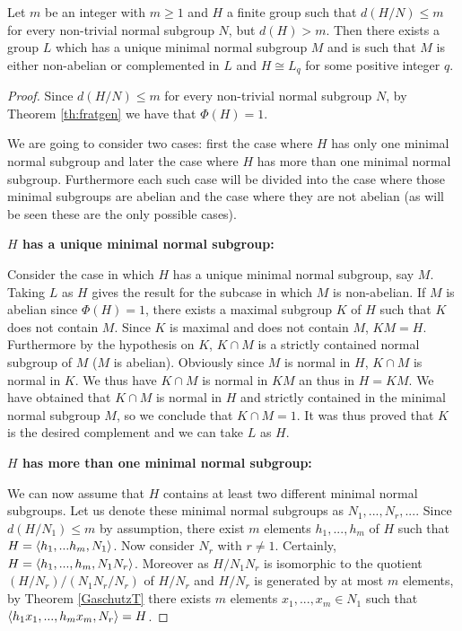 \begin{theorem}
    Let $m$ be an integer with $m \ge 1$ and $H$ a finite group such that $d(H/N) \le m$ for every non-trivial normal subgroup $N$, but $d(H) > m$. Then there exists a group $L$ which has a unique minimal normal subgroup $M$ and is such that $M$ is either non-abelian or complemented in $L$ and $H \cong L_q$ for some positive integer $q$.
\end{theorem}
\begin{proof}
    Since $d(H/N) \le m$ for every non-trivial normal subgroup $N$, by Theorem \ref{th:fratgen} we have that $\Phi(H) = 1$.
    
    We are going to consider two cases: first the case where $H$ has only one minimal normal subgroup and later the case where $H$ has more than one minimal normal subgroup. Furthermore each such case will be divided into the case where those minimal subgroups are abelian and the case where they are not abelian (as will be seen these are the only possible cases).

    \vspace{\baselineskip}
    \noindent
    \textbf{$H$ has a unique minimal normal subgroup:}
    \vspace{\baselineskip}

    Consider the case in which $H$ has a unique minimal normal subgroup, say $M$. 
    Taking $L$ as $H$ gives the result for the subcase in which $M$ is non-abelian.
    If $M$ is abelian since $\Phi(H) = 1$, there exists a maximal subgroup $K$ of $H$ such that $K$ does not contain $M$. 
    Since $K$ is maximal and does not contain $M$, $KM = H$. 
    Furthermore by the hypothesis on $K$, $K \cap M$ is a strictly contained normal subgroup of $M$ ($M$ is abelian). Obviously since $M$ is normal in $H$, $K \cap M$ is normal in $K$. We thus have $K \cap M$ is normal in $KM$ an thus in $H=KM$. We have obtained that $K \cap M$ is normal in $H$ and strictly contained in the minimal normal subgroup $M$, so we conclude that $K \cap M = 1$. It was thus proved that $K$ is the desired complement and we can take $L$ as $H$.   

    \vspace{\baselineskip}
    \noindent
    \textbf{$H$ has more than one minimal normal subgroup:}
    \vspace{\baselineskip}

    We can now assume that $H$ contains at least two different minimal normal subgroups. 
    Let us denote these minimal normal subgroups as $N_1, ...,N_r, ...$. 
    Since $d(H/N_1) \le m$ by assumption, there exist $m$ elements $h_1,...,h_m$ of $H$ such that $H = \langle h_1,...h_m, N_1 \rangle$. Now consider $N_r$ with $r \ne 1$. Certainly, $H = \langle h_1,...,h_m,N_1N_r \rangle$. Moreover as $H/N_1N_r$ is isomorphic to the quotient $(H/N_r)/(N_1N_r/N_r)$ of $H/N_r$ and $H/N_r$ is generated by at most $m$ elements, by Theorem \ref{GaschutzT} there exists $m$ elements $x_1,...,x_m \in N_1$ such that $\langle h_1x_1,...,h_mx_m,N_r \rangle = H$.


\end{proof}
